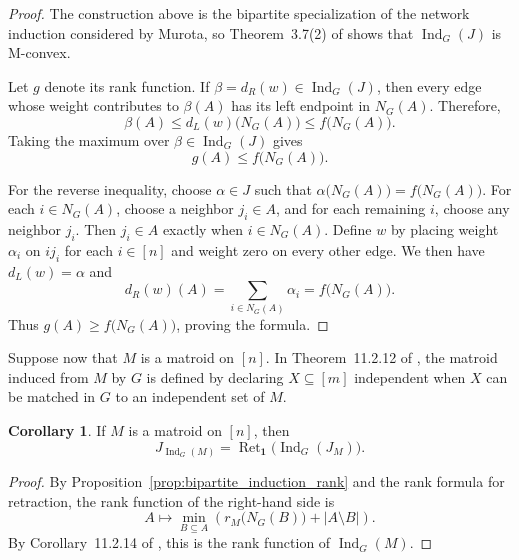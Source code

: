 \documentclass[11pt]{article}
\theoremstyle{definition}
\newtheorem{corollary}[theorem]{Corollary}
\theoremstyle{remark}
\newcommand{\ones}{\textbf{1}}
\DeclareMathOperator{\Ret}{Ret}                %
\begin{document}
\begin{proof}
    The construction above is the bipartite specialization of the network induction considered by Murota, so Theorem~3.7(2) of \cite{murota2020basicoperationsrelatednetwork} shows that $\operatorname{Ind}_G(J)$ is M-convex.

    Let $g$ denote its rank function. If $\beta=d_R(w)\in\operatorname{Ind}_G(J)$, then every edge whose weight contributes to $\beta(A)$ has its left endpoint in $N_G(A)$. Therefore,
    \[
        \beta(A)
        \leq d_L(w)\bigl(N_G(A)\bigr)
        \leq f\bigl(N_G(A)\bigr).
    \]
    Taking the maximum over $\beta\in\operatorname{Ind}_G(J)$ gives
    \[
        g(A)\leq f\bigl(N_G(A)\bigr).
    \]

    For the reverse inequality, choose $\alpha\in J$ such that
    $\alpha\bigl(N_G(A)\bigr)=f\bigl(N_G(A)\bigr)$. For each
    $i\in N_G(A)$, choose a neighbor $j_i\in A$, and for each remaining
    $i$, choose any neighbor $j_i$. Then $j_i\in A$ exactly when
    $i\in N_G(A)$. Define $w$ by placing weight $\alpha_i$ on $ij_i$
    for each $i\in[n]$ and weight zero on every other edge. We then have
    $d_L(w)=\alpha$ and
    \[
        d_R(w)(A)
        =
        \sum_{i\in N_G(A)}\alpha_i
        =
        f\bigl(N_G(A)\bigr).
    \]
    Thus $g(A)\geq f\bigl(N_G(A)\bigr)$, proving the formula.
\end{proof}

Suppose now that $M$ is a matroid on $[n]$. In Theorem~11.2.12 of \cite{oxleyMatroidTheory2011}, the matroid induced from $M$ by $G$ is defined by declaring $X\subseteq[m]$ independent when $X$ can be matched in $G$ to an independent set of $M$.

\begin{corollary}
    If $M$ is a matroid on $[n]$, then
    \[
        J_{\operatorname{Ind}_G(M)}
        =
        \Ret_{\ones}\bigl(\operatorname{Ind}_G(J_M)\bigr).
    \]
\end{corollary}

\begin{proof}
    By Proposition~\ref{prop:bipartite_induction_rank} and the rank formula for retraction, the rank function of the right-hand side is
    \[
        A\longmapsto
        \min_{B\subseteq A}
        \left(
            r_M\bigl(N_G(B)\bigr)+|A\setminus B|
        \right).
    \]
    By Corollary~11.2.14 of \cite{oxleyMatroidTheory2011}, this is the rank function of $\operatorname{Ind}_G(M)$.
\end{proof}
\end{document}
